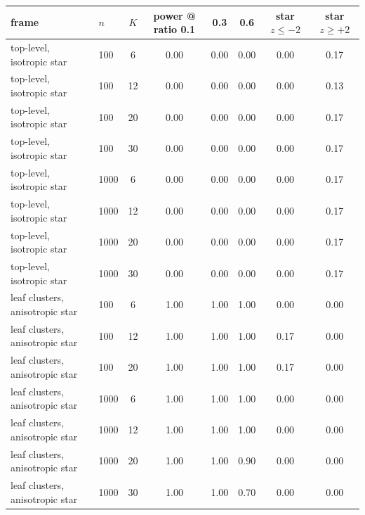 \begin{table}[H]
\centering
\small
\setlength{\tabcolsep}{4pt}
\begin{tabular}{llcccccc}
\toprule
frame & $n$ & $K$ & power @ ratio 0.1 & 0.3 & 0.6 & star $z\le-2$ & star $z\ge+2$ \\
\midrule
top-level, isotropic star & 100 & 6 & 0.00 & 0.00 & 0.00 & 0.00 & 0.17 \\
top-level, isotropic star & 100 & 12 & 0.00 & 0.00 & 0.00 & 0.00 & 0.13 \\
top-level, isotropic star & 100 & 20 & 0.00 & 0.00 & 0.00 & 0.00 & 0.17 \\
top-level, isotropic star & 100 & 30 & 0.00 & 0.00 & 0.00 & 0.00 & 0.17 \\
top-level, isotropic star & 1000 & 6 & 0.00 & 0.00 & 0.00 & 0.00 & 0.17 \\
top-level, isotropic star & 1000 & 12 & 0.00 & 0.00 & 0.00 & 0.00 & 0.17 \\
top-level, isotropic star & 1000 & 20 & 0.00 & 0.00 & 0.00 & 0.00 & 0.17 \\
top-level, isotropic star & 1000 & 30 & 0.00 & 0.00 & 0.00 & 0.00 & 0.17 \\
\midrule
leaf clusters, anisotropic star & 100 & 6 & 1.00 & 1.00 & 1.00 & 0.00 & 0.00 \\
leaf clusters, anisotropic star & 100 & 12 & 1.00 & 1.00 & 1.00 & 0.17 & 0.00 \\
leaf clusters, anisotropic star & 100 & 20 & 1.00 & 1.00 & 1.00 & 0.17 & 0.00 \\
leaf clusters, anisotropic star & 1000 & 6 & 1.00 & 1.00 & 1.00 & 0.00 & 0.00 \\
leaf clusters, anisotropic star & 1000 & 12 & 1.00 & 1.00 & 1.00 & 0.00 & 0.00 \\
leaf clusters, anisotropic star & 1000 & 20 & 1.00 & 1.00 & 0.90 & 0.00 & 0.00 \\
leaf clusters, anisotropic star & 1000 & 30 & 1.00 & 1.00 & 0.70 & 0.00 & 0.00 \\
\bottomrule
\end{tabular}

\end{table}
